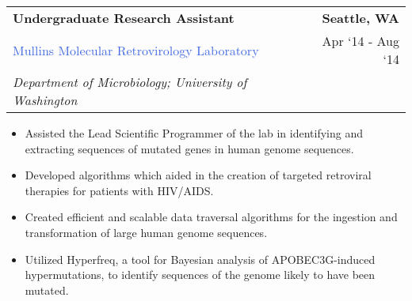 \documentclass[10pt]{article}
\newcommand{\highlightcolor}{RoyalBlue}
\newcommand{\tabularxwidth}{\textwidth}
\begin{document}
    \begin{minipage}{\tabularxwidth}

        \begin{tabularx}{\tabularxwidth}{X r}
            \textbf{Undergraduate Research Assistant} & \textbf{Seattle, 
        WA} \\
            \textcolor{\highlightcolor}{Mullins Molecular Retrovirology Laboratory} & 
        
    Apr ‘14 - 
    Aug ‘14 \\
            
                
                    \textit{Department of Microbiology; University of Washington} & \\
                
            
            
        \end{tabularx}

        \begin{itemize}[noitemsep, topsep=3pt, parsep=0pt, partopsep=0pt]
            
                \item 
    Assisted the Lead Scientific Programmer of the lab in identifying and extracting sequences of mutated genes in human genome sequences.
            
                \item 
    Developed algorithms which aided in the creation of targeted retroviral therapies for patients with HIV/AIDS.
            
                \item 
    Created efficient and scalable data traversal algorithms for the ingestion and transformation of large human genome sequences.
            
                \item 
    Utilized Hyperfreq, a tool for Bayesian analysis of APOBEC3G-induced hypermutations, to identify sequences of the genome likely to have been mutated.
            
        \end{itemize}

        

    \end{minipage}
    
\end{document}
